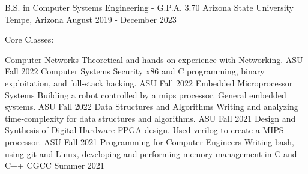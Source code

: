 

\begin{cventries}

  \cventry
    {B.S. in Computer Systems Engineering - G.P.A. 3.70} %
    {Arizona State University} %
    {Tempe, Arizona} %
    {August 2019 - December 2023} %
    {Core Classes:
    \begin{cvhonors}
        \cvhonor
            {Computer Networks} %
            {Theoretical and hands-on experience with Networking.} %
            {ASU} %
            {Fall 2022} %
        \cvhonor
            {Computer Systems Security} %
            {x86 and C programming, binary exploitation, and full-stack hacking.} %
            {ASU} %
            {Fall 2022} %
        \cvhonor
            {Embedded Microprocessor Systems} %
            {Building a robot controlled by a mips processor. General embedded systems.} %
            {ASU} %
            {Fall 2022} %
        \cvhonor
            {Data Structures and Algorithms} %
            {Writing and analyzing time‐complexity for data structures and algorithms.} %
            {ASU} %
            {Fall 2021} %
        \cvhonor
            {Design and Synthesis of Digital Hardware} %
            {FPGA design. Used verilog to create a MIPS processor.} %
            {ASU} %
            {Fall 2021} %
        \cvhonor
            {Programming for Computer Engineers} %
            {Writing bash, using git and Linux, developing and performing memory management in C and C++} %
            {CGCC} %
            {Summer 2021} %
    \end{cvhonors}
}

\end{cventries}

